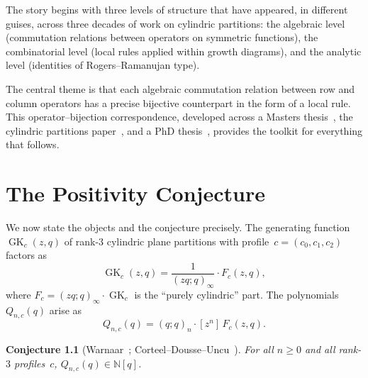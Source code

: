 \documentclass[11pt]{report}
\newcommand{\N}{\mathbb{N}}
\newcommand{\GK}{\operatorname{GK}}
\newcommand{\qpochn}[3]{(#1;#2)_{#3}}
\theoremstyle{plain}
\newtheorem{conjecture}[theorem]{Conjecture}
\theoremstyle{definition}
\begin{document}
The story begins with three levels of structure that have
appeared, in different guises, across three decades of work
on cylindric partitions: the algebraic level (commutation
relations between operators on symmetric functions), the
combinatorial level (local rules applied within growth
diagrams), and the analytic level (identities of
Rogers--Ramanujan type).

The central theme is that each algebraic commutation
relation between row and column operators has a precise
bijective counterpart in the form of a local rule.  This
operator--bijection correspondence, developed across a
Masters thesis~\cite{langer-masters}, the cylindric
partitions paper~\cite{langer-cpp1}, and a PhD
thesis~\cite{langer-thesis}, provides the toolkit for
everything that follows.




\chapter{The Positivity Conjecture}
\label{ch:conjecture}

We now state the objects and the conjecture precisely.
The generating function $\GK_c(z,q)$ of rank-$3$ cylindric
plane partitions with profile~$c = (c_0, c_1, c_2)$
factors as
\[
  \GK_c(z,q) = \frac{1}{\qpochn{zq}{q}{\infty}}
  \cdot F_c(z,q),
\]
where $F_c = \qpochn{zq}{q}{\infty} \cdot \GK_c$ is the
``purely cylindric'' part.  The polynomials $Q_{n,c}(q)$
arise as
\[
  Q_{n,c}(q) = \qpochn{q}{q}{n} \cdot [z^n]\, F_c(z,q).
\]

\begin{conjecture}[Warnaar~\cite{Warnaar}; Corteel--Dousse--Uncu~\cite{CDU}]
\label{conj:main}
For all $n \geq 0$ and all rank-$3$ profiles~$c$,
$Q_{n,c}(q) \in \N[q]$.
\end{conjecture}
\end{document}
